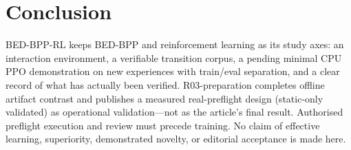 \section{Conclusion}

BED-BPP-RL keeps BED-BPP and reinforcement learning as its study axes: an
interaction environment, a verifiable transition corpus, a pending minimal CPU
PPO demonstration on new experiences with train/eval separation, and a clear
record of what has actually been verified. R03-preparation completes offline
artifact contrast and publishes a measured real-preflight design (static-only
validated) as operational validation---not as the article's final result.
Authorised preflight execution and review must precede training. No claim of
effective learning, superiority, demonstrated novelty, or editorial acceptance
is made here.
